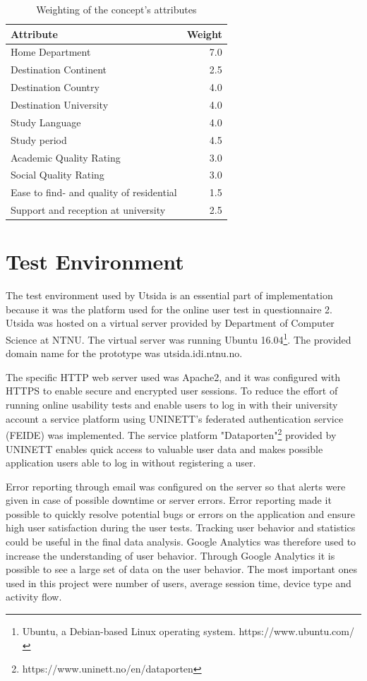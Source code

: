 \begin{table}[h]
\centering
\caption{Weighting of the concept's attributes}
\label{tab:attribute_weights}
\begin{tabulary}{\textwidth}{|L|R|}
\hline
\textbf{Attribute} & \textbf{Weight} \\ \hline \hline
Home Department & 7.0 \\ \hline
Destination Continent & 2.5 \\ \hline
Destination Country & 4.0 \\ \hline
Destination University & 4.0 \\ \hline
Study Language & 4.0 \\ \hline
Study period & 4.5 \\ \hline
Academic Quality Rating & 3.0 \\ \hline
Social Quality Rating & 3.0 \\ \hline
Ease to find- and quality of residential & 1.5 \\ \hline
Support and reception at university & 2.5 \\ \hline
\end{tabulary}
\end{table}

\FloatBarrier
\section{Test Environment}
The test environment used by Utsida is an essential part of implementation because it was the platform used for the online user test in questionnaire 2. Utsida was hosted on a virtual server provided by Department of Computer Science at NTNU. The virtual server was running Ubuntu 16.04\footnote{Ubuntu, a Debian-based Linux operating system. https://www.ubuntu.com/}. The provided domain name for the prototype was utsida.idi.ntnu.no.

The specific HTTP web server used was Apache2, and it was configured with HTTPS to enable secure and encrypted user sessions. To reduce the effort of running online usability tests and enable users to log in with their university account a service platform using UNINETT's federated authentication service (FEIDE) was implemented. The service platform "Dataporten"\footnote{https://www.uninett.no/en/dataporten} provided by UNINETT enables quick access to valuable user data and makes possible application users able to log in without registering a user.

Error reporting through email was configured on the server so that alerts were given in case of possible downtime or server errors. Error reporting made it possible to quickly resolve potential bugs or errors on the application and ensure high user satisfaction during the user tests. Tracking user behavior and statistics could be useful in the final data analysis. Google Analytics was therefore used to increase the understanding of user behavior. Through Google Analytics it is possible to see a large set of data on the user behavior. The most important ones used in this project were number of users, average session time, device type and activity flow.  

